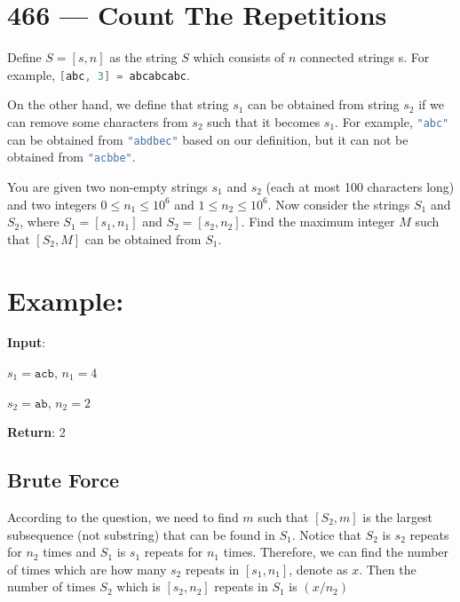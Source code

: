 \section{466 --- Count The Repetitions}
Define $S = [s,n]$ as the string $S$ which consists of $n$ connected strings s. For example, \lstinline[language=C++, basicstyle=\small\ttfamily, keywordstyle=\bfseries\color{green!40!black}]|[abc, 3] = abcabcabc|.

On the other hand, we define that string $s_1$ can be obtained from string $s_2$ if we can remove some characters from $ s_2 $ such that it becomes $ s_1 $. For example, \lstinline[language=C++, basicstyle=\small\ttfamily, keywordstyle=\bfseries\color{green!40!black}]|"abc"| can be obtained from \lstinline[language=C++, basicstyle=\small\ttfamily, keywordstyle=\bfseries\color{green!40!black}]|"abdbec"| based on our definition, but it can not be obtained from \lstinline[language=C++, basicstyle=\small\ttfamily, keywordstyle=\bfseries\color{green!40!black}]|"acbbe"|.

You are given two non-empty strings $ s_1 $ and $ s_2 $ (each at most 100 characters long) and two integers $0 \leq n_1 \leq 10^6$ and $1 \leq n_2 \leq 10^6$. Now consider the strings $S_1$ and $S_2$, where $S_1=[s_1,n_1]$ and $S_2=[s_2,n_2]$. Find the maximum integer $M$ such that $[S_2,M]$ can be obtained from $S_1$.

\section{Example:}

\begin{flushleft}
\textbf{Input}:

$s_1=\texttt{acb}$, $n_1=4$

$s_2=\texttt{ab}$, $n_2=2$

\textbf{Return}: 2

\end{flushleft}

\subsection{Brute Force}
According to the question, we need to find $m$ such that $[S_2,m]$ is the largest subsequence (not substring) that can be found in $S_1$. Notice that $S_2$ is $s_2$ repeats for $n_2$ times and $S_1$ is $s_1$ repeats for $n_1$ times. Therefore, we can find the number of times which are how many $s_2$ repeats in $[s_1,n_1]$, denote as $x$. Then the number of times $S_2$ which is $[s_2,n_2]$ repeats in $S_1$ is $(x/n_2)$

